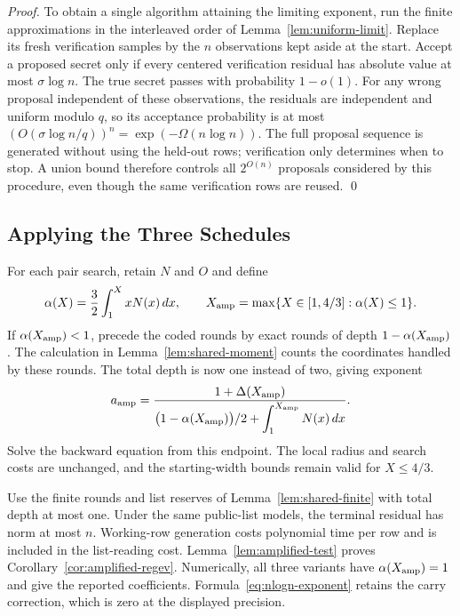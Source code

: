 \documentclass[runningheads,envcountsame,envcountsect,orivec]{llncs}
\begin{document}
\begin{proof}
To obtain a single algorithm attaining the limiting exponent,
run the finite approximations in the interleaved order of
Lemma~\ref{lem:uniform-limit}. Replace its fresh verification
samples by the $n$ observations kept aside at the start.
Accept a proposed secret only if every centered verification
residual has absolute value at most $\sigma\log n$.
The true secret passes with probability $1-o(1)$.
For any wrong proposal independent of these observations,
the residuals are independent and uniform modulo $q$, so its
acceptance probability is at most
$(O(\sigma\log n/q))^n=\exp(-\Omega(n\log n))$.
The full proposal sequence is generated without using the
held-out rows; verification only determines when to stop.
A union bound therefore controls all $2^{O(n)}$ proposals
considered by this procedure, even though the same
verification rows are reused.
\qed
\end{proof}

\subsection{Applying the Three Schedules}

For each pair search, retain $N$ and $O$ and define
\[
 \alpha(X)=\frac32\int_1^X xN(x)\,dx,
 \qquad
 X_{\rm amp}=\max\{X\in[1,4/3]:\alpha(X)\le1\}.
\]
If $\alpha(X_{\rm amp})<1$, precede the coded rounds by
exact rounds of depth $1-\alpha(X_{\rm amp})$.
The calculation in Lemma~\ref{lem:shared-moment} counts the
coordinates handled by these rounds. The total depth is now
one instead of two, giving exponent
\begin{align}
 a_{\rm amp}
  =\frac{1+\Delta(X_{\rm amp})}
      {\bigl(1-\alpha(X_{\rm amp})\bigr)/2
                  +\displaystyle\int_1^{X_{\rm amp}}N(x)\,dx}.
 \label{eq:nlogn-exponent}
\end{align}
Solve the backward equation from this endpoint. The local radius and
search costs are unchanged, and the starting-width bounds remain valid
for $X\le4/3$.

Use the finite rounds and list reserves of Lemma~\ref{lem:shared-finite}
with total depth at most one. Under the same public-list models,
the terminal residual has norm at most $n$. Working-row generation
costs polynomial time per row and is included in the list-reading cost.
Lemma~\ref{lem:amplified-test} proves Corollary~\ref{cor:amplified-regev}.
Numerically, all three variants have $\alpha(X_{\rm amp})=1$ and give
the reported coefficients. Formula~\eqref{eq:nlogn-exponent} retains
the carry correction, which is zero at the displayed precision.

\label{page:appendices-end}
\end{document}
